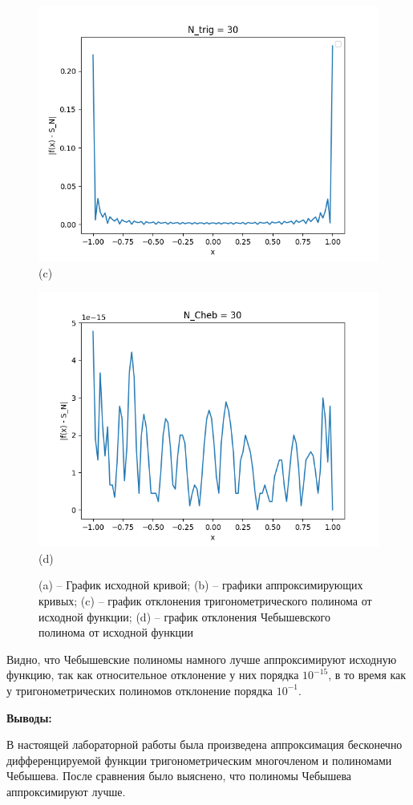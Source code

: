 \begin{figure}[ht!]
\begin{center}
\begin{minipage}{0.45\textwidth}
\end{minipage}
\begin{minipage}{0.45\textwidth}
\centering
 \includegraphics[width=0.95\linewidth]{Figures/Trig_deviation.png}\\(c)
\end{minipage}
\centering
\begin{minipage}{0.45\textwidth}
\centering
 \includegraphics[width=0.95\linewidth]{Figures/Cheb_deviation.png}\\(d)
\end{minipage}
\end{center}
\caption{(a) -- График исходной кривой; (b) -- графики аппроксимирующих кривых; (c) -- график отклонения тригонометрического полинома от исходной функции; (d) -- график отклонения Чебышевского полинома от исходной функции\label{graphs}}
\end{figure}

Видно, что Чебышевские полиномы намного лучше аппроксимируют исходную функцию, так как относительное отклонение у них порядка $10^{-15}$, в то время как у тригонометрических полиномов отклонение порядка $10^{-1}$.

\textbf{Выводы:}

В настоящей лабораторной работы была произведена аппроксимация бесконечно дифференцируемой функции тригонометрическим многочленом и полиномами Чебышева. После сравнения было выяснено, что полиномы Чебышева аппроксимируют лучше.